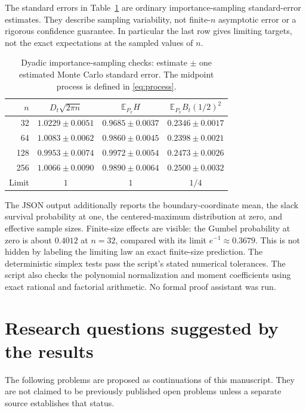 \documentclass[11pt,letterpaper]{article}
\numberwithin{equation}{section}
\theoremstyle{definition}
\theoremstyle{remark}
\newcommand{\EE}{\mathbb E}
\begin{document}
The standard errors in Table~\ref{tab:mc} are ordinary importance-sampling
standard-error estimates. They describe sampling variability, not finite-$n$
asymptotic error or a rigorous confidence guarantee. In particular the last
row gives limiting targets, not the exact expectations at the sampled values
of $n$.

\begin{table}[htbp]
\centering
\small
\caption{Dyadic importance-sampling checks: estimate $\pm$ one estimated
Monte Carlo standard error. The midpoint process is defined in
\eqref{eq:process}.}
\label{tab:mc}
\begin{tabular}{rccc}
\toprule
$n$ & $D_t\sqrt{2\pi n}$ & $\EE_{P_x}H$ & $\EE_{P_x}B_t(1/2)^2$\\
\midrule
32  & $1.0229\pm0.0051$ & $0.9685\pm0.0037$ & $0.2346\pm0.0017$\\
64  & $1.0083\pm0.0062$ & $0.9860\pm0.0045$ & $0.2398\pm0.0021$\\
128 & $0.9953\pm0.0074$ & $0.9972\pm0.0054$ & $0.2473\pm0.0026$\\
256 & $1.0066\pm0.0090$ & $0.9890\pm0.0064$ & $0.2500\pm0.0032$\\
\midrule
Limit & $1$ & $1$ & $1/4$\\
\bottomrule
\end{tabular}
\end{table}

The JSON output additionally reports the boundary-coordinate mean, the slack
survival probability at one, the centered-maximum distribution at zero, and
effective sample sizes. Finite-size effects are visible: the Gumbel
probability at zero is about $0.4012$ at $n=32$, compared with its limit
$e^{-1}\approx0.3679$. This is not hidden by labeling the limiting law an
exact finite-size prediction. The deterministic simplex tests pass the
script's stated numerical tolerances. The script also checks the polynomial
normalization and moment coefficients using exact rational and factorial
arithmetic. No formal proof assistant was run.

\section{Research questions suggested by the results}
\label{sec:questions}

The following problems are proposed as continuations of this manuscript.
They are not claimed to be previously published open problems unless a
separate source establishes that status.
\end{document}
